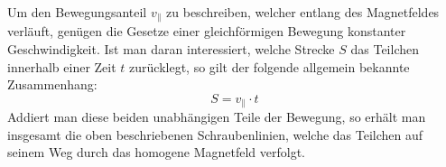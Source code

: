 Um den Bewegungsanteil \(v_\parallel\) zu beschreiben, welcher entlang des Magnetfeldes verl\"auft, gen\"ugen die Gesetze einer
gleichf\"ormigen Bewegung konstanter Geschwindigkeit. Ist man daran interessiert, welche Strecke \(S\) das Teilchen innerhalb einer
Zeit \(t\) zur\"ucklegt, so gilt der folgende allgemein bekannte Zusammenhang:
\begin{equation}
  S = v_\parallel \cdot t
\end{equation}
Addiert man diese beiden unabh\"angigen Teile der Bewegung, so erh\"alt man insgesamt die oben beschriebenen Schraubenlinien, welche
das Teilchen auf seinem Weg durch das homogene Magnetfeld verfolgt.
